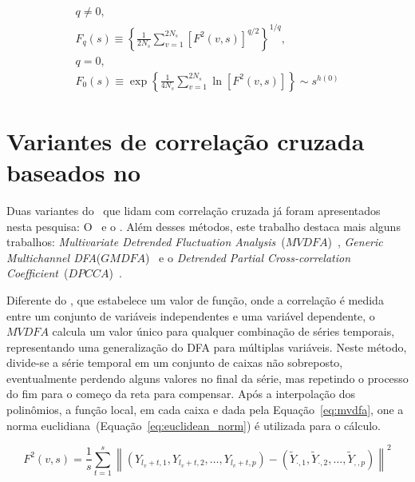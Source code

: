 \begin{equation}\label{eq:multifractal}
  \begin{split}
  q \neq 0,
  \\[10pt]
  F_q(s) \equiv \left\{ \frac{1}{2N_s} \sum_{v=1}^{2N_s} \left[ F^2(v,s) \right]^{q/2} \right\}^{1/q},
  \\[10pt]
  q=0,
  \\[10pt]
  F_0(s) \equiv \exp\left\{ \frac{1}{4N_s} \sum_{v=1}^{2N_s} \ln\left[ F^2(v,s) \right] \right\} \sim s^{h(0)}
  \end{split}
  \end{equation}

\section{Variantes de correlação cruzada baseados no \dcca}
\label{ss:vari_cross}

Duas variantes do \dcca~que lidam com correlação cruzada já foram apresentados nesta pesquisa: O \pdcca~e o \dmc. Além desses métodos, este trabalho destaca mais alguns trabalhos: \textit{Multivariate Detrended Fluctuation Analysis}~($MVDFA$)~\cite{xiongDetrendedFluctuationAnalysis2017}, \textit{Generic Multichannel DFA}($GMDFA$)~\cite{naveedFullyMultivariateDetrended2025} e o \textit{Detrended Partial Cross-correlation Coefficient}~($DPCCA$)~\cite{yuanDetrendedPartialCrossCorrelationAnalysis2015}.

Diferente do \dmc, que estabelece um valor de função, onde a correlação é medida entre um conjunto de variáveis independentes e uma variável dependente, o $MVDFA$ calcula um valor único para qualquer combinação de séries temporais, representando uma generalização do DFA para múltiplas variáveis. Neste método, divide-se a série temporal em um conjunto de caixas não sobreposto, eventualmente perdendo alguns valores no final da série, mas repetindo o processo do fim para o começo da reta para compensar. Após a interpolação dos polinômios, a função local, em cada caixa e dada pela Equação~\ref{eq:mvdfa}, one a norma euclidiana~(Equação~\ref{eq:euclidean_norm}) é utilizada para o cálculo.


\begin{equation}\label{eq:mvdfa}
  F^2(v, s)=\frac{1}{s} \sum_{t=1}^s\left\|\left(Y_{l_v+t, 1}, Y_{l_v+t, 2}, \ldots, Y_{l_v+t, p}\right)-\left(\tilde{Y}_{\cdot, 1}, \tilde{Y}_{\cdot, 2}, \ldots, \tilde{Y}_{,, p}\right)\right\|^2
  \end{equation}

